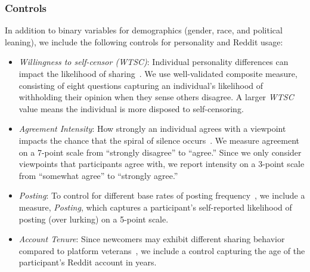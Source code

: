  

\subsubsection{Controls}
In addition to binary variables for demographics (gender, race, and political leaning), we include the following controls for personality and Reddit usage:

\begin{itemize}
[topsep=0pt,itemsep=-1ex,partopsep=1ex,parsep=1ex,leftmargin=5pt]
    \item \emph{Willingness to self-censor (WTSC)}: Individual personality differences can impact the likelihood of sharing~\cite{gearhart2014gay}. We use \citet{hayes2005willingness} well-validated composite measure, consisting of eight questions capturing an individual's likelihood of withholding their opinion when they sense others disagree. A larger \textit{WTSC} value means the individual is more disposed to self-censoring.
    \item \emph{Agreement Intensity}: How strongly an individual agrees with a viewpoint impacts the chance that the spiral of silence occurs~\cite{matthes2010spiral}. We measure agreement on a 7-point scale from ``strongly disagree'' to ``agree.'' Since we only consider viewpoints that participants agree with, we report intensity on a 3-point scale from ``somewhat agree'' to ``strongly agree.''
    \item \emph{Posting}: To control for different base rates of posting frequency~\cite{gong2015characterizing}, we include a measure, \textit{Posting}, which captures a participant's self-reported likelihood of posting (over lurking) on a 5-point scale.
    \item \emph{Account Tenure}: Since newcomers may exhibit different sharing behavior compared to platform veterans~\cite{yang2017commitment}, we include a control capturing the age of the participant's Reddit account in years. 
\end{itemize}

